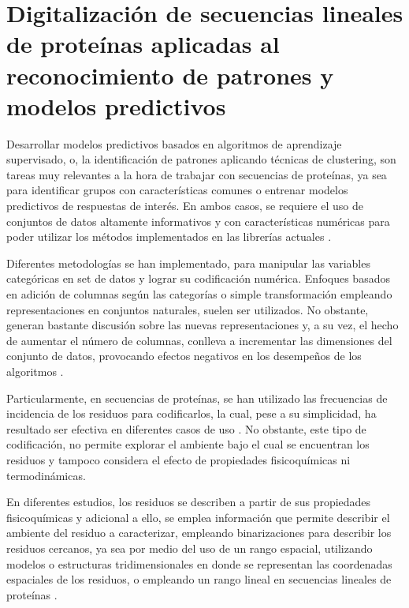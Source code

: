 \chapter{Digitalización de secuencias lineales de proteínas aplicadas al reconocimiento de patrones y modelos predictivos \label{cap3}}

\ifpdf
    \graphicspath{{Chapter3/Figs/Raster/}{Chapter3/Figs/PDF/}{Chapter3/Figs/}}
\else
    \graphicspath{{Chapter3/Figs/Vector/}{Chapter3/Figs/}}
\fi

Desarrollar modelos predictivos basados en algoritmos de aprendizaje supervisado, o, la identificación de patrones aplicando técnicas de clustering, son tareas muy relevantes a la hora de trabajar con secuencias de proteínas, ya sea para identificar grupos con características comunes o entrenar modelos predictivos de respuestas de interés. En ambos casos, se requiere el uso de conjuntos de datos altamente informativos y con características numéricas para poder utilizar los métodos implementados en las librerías actuales \cite{pedregosa2011scikit}.

Diferentes metodologías se han implementado, para manipular las variables categóricas en set de datos y lograr su codificación numérica. Enfoques basados en adición de columnas según las categorías o simple transformación empleando representaciones en conjuntos naturales, suelen ser utilizados. No obstante, generan bastante discusión sobre las nuevas representaciones y, a su vez, el hecho de aumentar el número de columnas, conlleva a incrementar las dimensiones del conjunto de datos, provocando efectos negativos en los desempeños de los algoritmos \cite{pedregosa2011scikit}. 

Particularmente, en secuencias de proteínas, se han utilizado las frecuencias de incidencia de los residuos para codificarlos, la cual, pese a su simplicidad, ha resultado ser efectiva en diferentes casos de uso \cite{ozbudak2014protein}. No obstante, este tipo de codificación, no permite explorar el ambiente bajo el cual se encuentran los residuos y tampoco considera el efecto de propiedades fisicoquímicas ni termodinámicas.

En diferentes estudios, los residuos se describen a partir de sus propiedades fisicoquímicas y adicional a ello, se emplea información que permite describir el ambiente del residuo a caracterizar, empleando binarizaciones para describir los residuos cercanos, ya sea por medio del uso de un rango espacial, utilizando modelos o estructuras tridimensionales en donde se representan las coordenadas espaciales de los residuos, o empleando un rango lineal en secuencias lineales de proteínas \cite{capriotti2005mutant2, capriotti2008three}.

